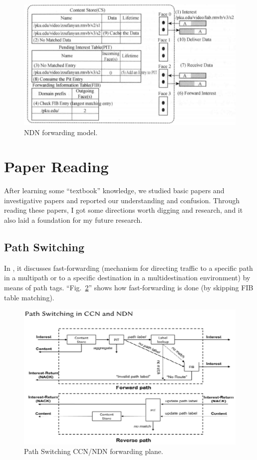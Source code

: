 \documentclass[conference]{IEEEtran}
\providecommand{\DIFdelbegin}{} %
\providecommand{\DIFdelend}{} %
\newcommand{\DIFscaledelfig}{0.5}
\newlength{\DIFdelgraphicswidth} %
\newlength{\DIFdelgraphicsheight} %
\newcommand{\DIFdelincludegraphics}[2][]{%
\sbox{\DIFdelgraphicsbox}{\DIFOincludegraphics[#1]{#2}}%
\settoboxwidth{\DIFdelgraphicswidth}{\DIFdelgraphicsbox} %
\settoboxtotalheight{\DIFdelgraphicsheight}{\DIFdelgraphicsbox} %
\scalebox{\DIFscaledelfig}{%
\parbox[b]{\DIFdelgraphicswidth}{\usebox{\DIFdelgraphicsbox}\\[-\baselineskip] \rule{\DIFdelgraphicswidth}{0em}}\llap{\resizebox{\DIFdelgraphicswidth}{\DIFdelgraphicsheight}{%
\setlength{\unitlength}{\DIFdelgraphicswidth}%
\begin{picture}(1,1)%
\thicklines\linethickness{2pt} %
{\color[rgb]{1,0,0}\put(0,0){\framebox(1,1){}}}%
{\color[rgb]{1,0,0}\put(0,0){\line( 1,1){1}}}%
{\color[rgb]{1,0,0}\put(0,1){\line(1,-1){1}}}%
\end{picture}%
}\hspace*{3pt}}} %
} %
\DeclareRobustCommand{\DIFdelbegin}{\DIFOdelbegin \let\includegraphics\DIFdelincludegraphics} %
\DeclareRobustCommand{\DIFdelend}{\DIFOaddend \let\includegraphics\DIFOincludegraphics} %
\begin{document}
\begin{figure}[htbp]
\centerline{\includegraphics[scale=0.65]{fig_fm.png}}
\caption{NDN forwarding model.}
\label{fig_fm}
\end{figure}

\section{Paper Reading}
After learning some “textbook” knowledge, we studied basic papers and investigative papers and reported our understanding and confusion. Through reading these papers, I got some directions worth digging and research, and it also laid a foundation for my future research.

\subsection{Path Switching}\label{PS}
In \cite{b2}, it discusses fast-forwarding (mechanism for directing traffic to a specific path in a multipath or to a specific destination in a multidestination environment) by means of path tags.
``Fig.~\ref{fig_pl}'' shows how fast-forwarding is done (by skipping FIB table matching).
\DIFdelbegin %

\DIFdelend \begin{figure}[htbp]
\centerline{\includegraphics[scale=0.75]{fig_pl.png}}
\caption{Path Switching CCN/NDN forwarding plane.}
\label{fig_pl}
\end{figure}
\end{document}
